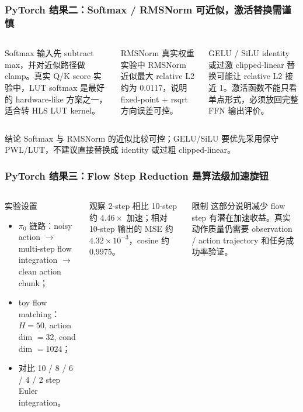 \documentclass[10pt, aspectratio=169]{beamer}
\newcommand{\piZero}{\texorpdfstring{$\pi_0$}{pi0}\xspace}
\newcommand{\ra}{\ensuremath{\rightarrow}\xspace}
\begin{document}
\begin{frame}
  \frametitle{PyTorch 结果二：Softmax / RMSNorm 可近似，激活替换需谨慎}
  \small
  \begin{columns}[T,onlytextwidth]
    \begin{block}{Softmax}
      \footnotesize
      输入先 subtract max，并对近似路径做 clamp。真实 Q/K score 实验中，LUT softmax 是最好的 hardware-like 方案之一，适合转 HLS LUT kernel。
    \end{block}

    \begin{block}{RMSNorm}
      \footnotesize
      真实权重实验中 RMSNorm 近似最大 relative L2 约为 0.0117，说明 fixed-point + rsqrt 方向误差可控。
    \end{block}

    \begin{alertblock}{GELU / SiLU}
      \footnotesize
      identity 或过激 clipped-linear 替换可能让 relative L2 接近 1。激活函数不能只看单点形式，必须放回完整 FFN 输出评价。
    \end{alertblock}
  \end{columns}

  \vspace{4pt}
  \begin{exampleblock}{结论}
    Softmax 与 RMSNorm 的近似比较可控；GELU/SiLU 要优先采用保守 PWL/LUT，不建议直接替换成 identity 或过粗 clipped-linear。
  \end{exampleblock}
\end{frame}

\begin{frame}
  \frametitle{PyTorch 结果三：Flow Step Reduction 是算法级加速旋钮}
  \small
  \begin{columns}[T,onlytextwidth]
    \begin{block}{实验设置}
      \begin{itemize}
        \item \piZero 链路：noisy action \ra multi-step flow integration \ra clean action chunk；
        \item toy flow matching：$H=50$, action dim $=32$, cond dim $=1024$；
        \item 对比 10 / 8 / 6 / 4 / 2 step Euler integration。
      \end{itemize}
    \end{block}

    \begin{exampleblock}{观察}
      \footnotesize
      2-step 相比 10-step 约 $4.46\times$ 加速；相对 10-step 输出的 MSE 约 $4.32\times10^{-3}$，cosine 约 0.9975。
    \end{exampleblock}

    \begin{alertblock}{限制}
      \footnotesize
      这部分说明减少 flow step 有潜在加速收益。真实动作质量仍需要 observation / action trajectory 和任务成功率验证。
    \end{alertblock}
  \end{columns}
\end{frame}
\end{document}
